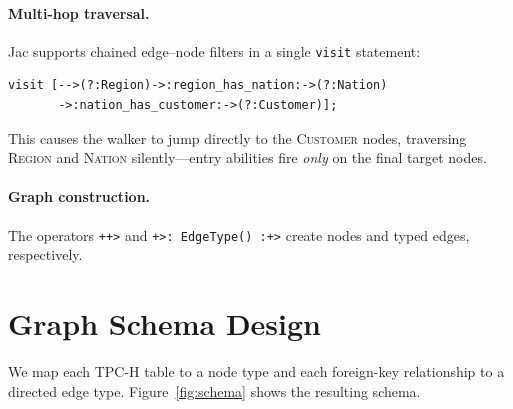 \documentclass[11pt]{article}
\begin{document}
\paragraph{Multi-hop traversal.}
Jac supports chained edge--node filters in a single \lstinline|visit|
statement:
\begin{lstlisting}
visit [-->(?:Region)->:region_has_nation:->(?:Nation)
       ->:nation_has_customer:->(?:Customer)];
\end{lstlisting}
This causes the walker to jump directly to the \textsc{Customer} nodes,
traversing \textsc{Region} and \textsc{Nation} silently---entry abilities
fire \emph{only} on the final target nodes.

\paragraph{Graph construction.}
The operators \lstinline|++>| and \lstinline|+>: EdgeType() :+>| create
nodes and typed edges, respectively.

\section{Graph Schema Design}

We map each TPC-H table to a node type and each foreign-key relationship to
a directed edge type.
Figure~\ref{fig:schema} shows the resulting schema.
\end{document}
